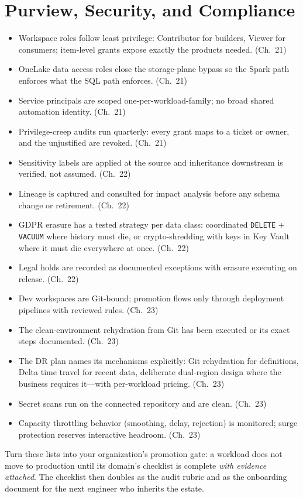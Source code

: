 \section{Purview, Security, and Compliance}
%
\begin{itemize}
    \item[$\square$] Workspace roles follow least privilege: Contributor for builders, Viewer
    for consumers; item-level grants expose exactly the products needed. (Ch.~21)
    \item[$\square$] OneLake data access roles close the storage-plane bypass so the Spark path
    enforces what the SQL path enforces. (Ch.~21)
    \item[$\square$] Service principals are scoped one-per-workload-family; no broad shared
    automation identity. (Ch.~21)
    \item[$\square$] Privilege-creep audits run quarterly: every grant maps to a ticket or
    owner, and the unjustified are revoked. (Ch.~21)
    \item[$\square$] Sensitivity labels are applied at the source and inheritance downstream is
    verified, not assumed. (Ch.~22)
    \item[$\square$] Lineage is captured and consulted for impact analysis before any schema
    change or retirement. (Ch.~22)
    \item[$\square$] GDPR erasure has a tested strategy per data class: coordinated
    \texttt{DELETE} + \texttt{VACUUM} where history must die, or crypto-shredding with keys in
    Key Vault where it must die everywhere at once. (Ch.~22)
    \item[$\square$] Legal holds are recorded as documented exceptions with erasure executing
    on release. (Ch.~22)
    \item[$\square$] Dev workspaces are Git-bound; promotion flows only through deployment
    pipelines with reviewed rules. (Ch.~23)
    \item[$\square$] The clean-environment rehydration from Git has been executed or its exact
    steps documented. (Ch.~23)
    \item[$\square$] The DR plan names its mechanisms explicitly: Git rehydration for
    definitions, Delta time travel for recent data, deliberate dual-region design where the
    business requires it---with per-workload pricing. (Ch.~23)
    \item[$\square$] Secret scans run on the connected repository and are clean. (Ch.~23)
    \item[$\square$] Capacity throttling behavior (smoothing, delay, rejection) is monitored;
    surge protection reserves interactive headroom. (Ch.~23)
\end{itemize}

\begin{tipbox}
Turn these lists into your organization's promotion gate: a workload does not move to
production until its domain's checklist is complete \emph{with evidence attached}. The
checklist then doubles as the audit rubric and as the onboarding document for the next
engineer who inherits the estate.
\end{tipbox}
